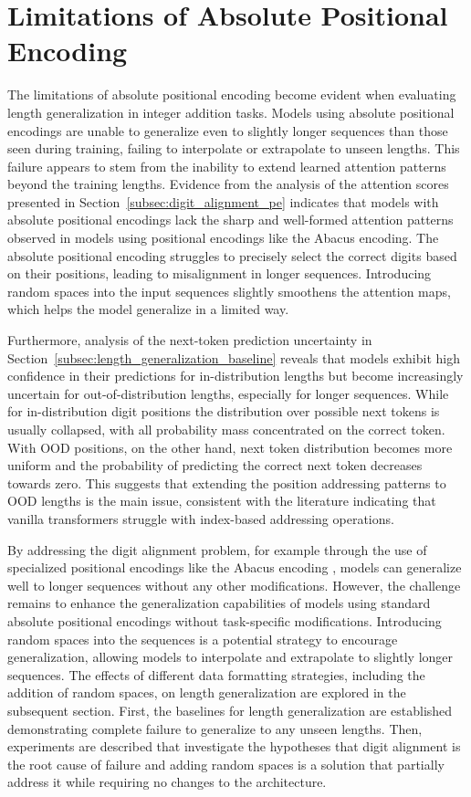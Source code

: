 \section{Limitations of Absolute Positional Encoding}\label{sec:absolute_positional_limitations}

The limitations of absolute positional encoding become evident when evaluating length generalization in integer addition tasks. Models using absolute positional encodings are unable to generalize even to slightly longer sequences than those seen during training, failing to interpolate or extrapolate to unseen lengths. This failure appears to stem from the inability to extend learned attention patterns beyond the training lengths. Evidence from the analysis of the attention scores presented in Section~\ref{subsec:digit_alignment_pe} indicates that models with absolute positional encodings lack the sharp and well-formed attention patterns observed in models using positional encodings like the Abacus encoding. The absolute positional encoding struggles to precisely select the correct digits based on their positions, leading to misalignment in longer sequences. Introducing random spaces into the input sequences slightly smoothens the attention maps, which helps the model generalize in a limited way.

Furthermore, analysis of the next-token prediction uncertainty in Section~\ref{subsec:length_generalization_baseline} reveals that models exhibit high confidence in their predictions for in-distribution lengths but become increasingly uncertain for out-of-distribution lengths, especially for longer sequences. While for in-distribution digit positions the distribution over possible next tokens is usually collapsed, with all probability mass concentrated on the correct token. With OOD positions, on the other hand, next token distribution becomes more uniform and the probability of predicting the correct next token decreases towards zero. This suggests that extending the position addressing patterns to OOD lengths is the main issue, consistent with the literature indicating that vanilla transformers struggle with index-based addressing operations.

By addressing the digit alignment problem, for example through the use of specialized positional encodings like the Abacus encoding \parencite{mcleish_transformers_2024}, models can generalize well to longer sequences without any other modifications. However, the challenge remains to enhance the generalization capabilities of models using standard absolute positional encodings without task-specific modifications. Introducing random spaces into the sequences is a potential strategy to encourage generalization, allowing models to interpolate and extrapolate to slightly longer sequences. The effects of different data formatting strategies, including the addition of random spaces, on length generalization are explored in the subsequent section. First, the baselines for length generalization are established demonstrating complete failure to generalize to any unseen lengths. Then, experiments are described that investigate the hypotheses that digit alignment is the root cause of failure and adding random spaces is a solution that partially address it while requiring no changes to the architecture.

